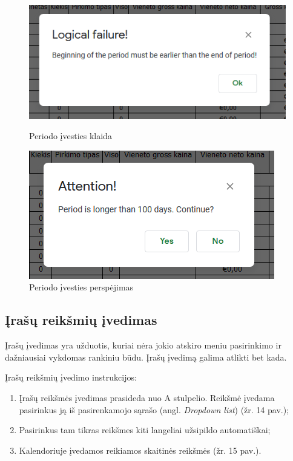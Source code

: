 \begin{figure}[h]
    \centering
    \begin{minipage}{0.45\textwidth}
        \centering
        \includegraphics[scale=0.6]{Images/Screenshots/calendar-creation-logical-failure.PNG} 
        \caption{Periodo įvesties klaida}
    \end{minipage}\hfill
    \begin{minipage}{0.45\textwidth}
        \centering
        \includegraphics[scale=0.6]{Images/Screenshots/calendar-creation-long-period.PNG}
        \caption{Periodo įvesties perspėjimas}
    \end{minipage}
\end{figure}

\subsection{Įrašų reikšmių įvedimas}
Įrašų įvedimas yra užduotis, kuriai nėra jokio atskiro meniu pasirinkimo ir dažniausiai vykdomas rankiniu būdu. Įrašų įvedimą galima atlikti bet kada.

\bigskip
Įrašų reikšmių įvedimo instrukcijos: 
\begin{enumerate}
    \itemsep0em 
    \item Įrašų reikšmės įvedimas prasideda nuo A stulpelio. Reikšmė įvedama pasirinkus ją iš pasirenkamojo sąrašo (angl. \textit{Dropdown list}) (žr. 14 pav.);
    \item Pasirinkus tam tikras reikšmes kiti langeliai užsipildo automatiškai;
    \item Kalendoriuje įvedamos reikiamos skaitinės reikšmės (žr. 15 pav.). 
\end{enumerate}

